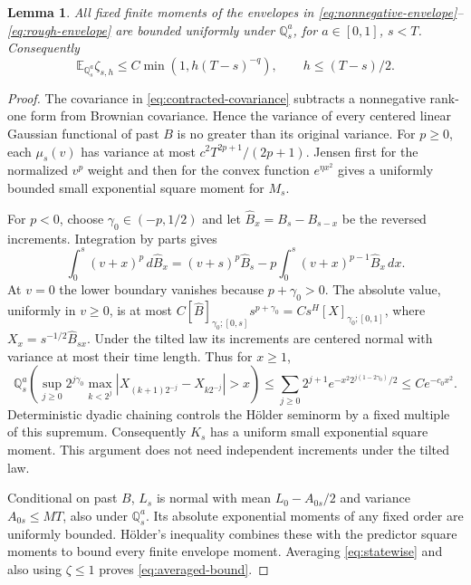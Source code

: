 \documentclass[11pt,a4paper]{amsart}
\theoremstyle{plain}
\newtheorem{lemma}[theorem]{Lemma}
\theoremstyle{definition}
\theoremstyle{remark}
\newcommand{\EE}{\mathbb{E}}
\newcommand{\QQ}{\mathbb{Q}}
\begin{document}
\begin{lemma}\label{lem:averaging}
All fixed finite moments of the envelopes in \eqref{eq:nonnegative-envelope}--\eqref{eq:rough-envelope} are bounded uniformly under $\QQ_s^a$, for $a\in[0,1]$, $s<T$. Consequently
\begin{equation}\label{eq:averaged-bound}
 \EE_{\QQ_s^a}\zeta_{s,h}\le C\min(1,h(T-s)^{-q}),
 \qquad h\le(T-s)/2.
\end{equation}
\end{lemma}
\begin{proof}
The covariance in \eqref{eq:contracted-covariance} subtracts a nonnegative rank-one form from Brownian covariance. Hence the variance of every centered linear Gaussian functional of past $B$ is no greater than its original variance. For $p\ge0$, each $\mu_s(v)$ has variance at most $c^2T^{2p+1}/(2p+1)$. Jensen first for the normalized $v^p$ weight and then for the convex function $e^{\eta x^2}$ gives a uniformly bounded small exponential square moment for $M_s$.

For $p<0$, choose $\gamma_0\in(-p,1/2)$ and let $\widehat B_x=B_s-B_{s-x}$ be the reversed increments. Integration by parts gives
\begin{equation}\label{eq:predictor-ibp}
 \int_0^s(v+x)^p\,d\widehat B_x
 =(v+s)^p\widehat B_s-p\int_0^s(v+x)^{p-1}\widehat B_x\,dx.
\end{equation}
At $v=0$ the lower boundary vanishes because $p+\gamma_0>0$. The absolute value, uniformly in $v\ge0$, is at most
$C[\widehat B]_{\gamma_0;[0,s]}s^{p+\gamma_0}
=C s^H[X]_{\gamma_0;[0,1]}$, where $X_x=s^{-1/2}\widehat B_{sx}$. Under the tilted law its increments are centered normal with variance at most their time length. Thus for $x\ge1$,
\begin{equation}\label{eq:dyadic-tail}
 \QQ_s^a\left(\sup_{j\ge0}2^{j\gamma_0}
 \max_{k<2^j}|X_{(k+1)2^{-j}}-X_{k2^{-j}}|>x\right)
 \le\sum_{j\ge0}2^{j+1}e^{-x^2 2^{j(1-2\gamma_0)}/2}
 \le C e^{-c_0x^2}.
\end{equation}
Deterministic dyadic chaining controls the H\"older seminorm by a fixed multiple of this supremum. Consequently $K_s$ has a uniform small exponential square moment. This argument does not need independent increments under the tilted law.

Conditional on past $B$, $L_s$ is normal with mean $L_0-A_{0s}/2$ and variance $A_{0s}\le MT$, also under $\QQ_s^a$. Its absolute exponential moments of any fixed order are uniformly bounded. H\"older's inequality combines these with the predictor square moments to bound every finite envelope moment. Averaging \eqref{eq:statewise} and also using $\zeta\le1$ proves \eqref{eq:averaged-bound}.
\end{proof}
\end{document}
